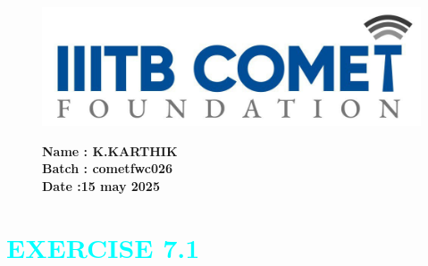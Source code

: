 \documentclass[a4paper,12pt]{article}
\begin{document}
\begin{figure}[h!]
    \begin{minipage}{0.45\textwidth} 
        \includegraphics[width=\textwidth]{sun.png} 
    \end{minipage} \hfill
    \begin{minipage}{0.45\textwidth} 
        \textbf{Name : K.KARTHIK} \\
    \textbf{Batch : cometfwc026} \\
  \textbf{Date :15 may 2025}
    \end{minipage}
\end{figure}
\section*{\centering \textcolor{cyan}{EXERCISE 7.1}}
\end{document}
